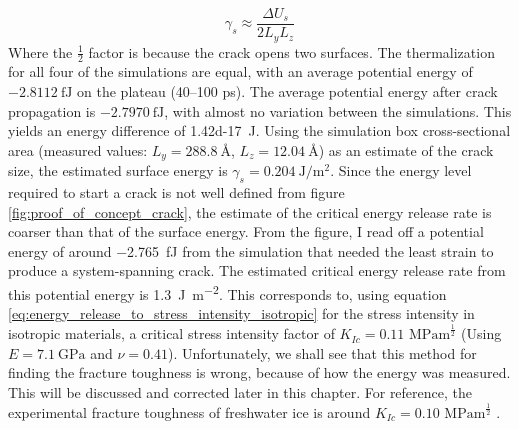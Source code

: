 \begin{equation}
	\gamma_s \approx \frac{\Delta U_s}{2 L_y L_z}
\end{equation}
%
Where the $\frac{1}{2}$ factor is because the crack opens two surfaces. The thermalization for all four of the simulations are equal, with an average potential energy of $\SI{-2.8112}{\femto\joule}$ on the plateau (40--100 \si{\pico\second}). The average potential energy after crack propagation is $\SI{-2.7970}{\femto\joule}$, with almost no variation between the simulations. This yields an energy difference of \SI{1.42d-17}{\joule}. Using the simulation box cross-sectional area (measured values: $L_y = \SI{288.8}{\angstrom}$, $L_z = \SI{12.04}{\angstrom}$) as an estimate of the crack size, the estimated surface energy is $\gamma_s = \SI{0.204}{\joule\per\meter\squared}$. Since the energy level required to start a crack is not well defined from figure \ref{fig:proof_of_concept_crack}, the estimate of the critical energy release rate is coarser than that of the surface energy. From the figure, I read off a potential energy of around \SI{-2.765}{\femto\joule} from the simulation that needed the least strain to produce a system-spanning crack. The estimated critical energy release rate from this potential energy is \SI{1.3}{\joule\per\meter\squared}. This corresponds to, using equation \ref{eq:energy_release_to_stress_intensity_isotropic} for the stress intensity in isotropic materials, a critical stress intensity factor of $K_{Ic} = 0.11 \text{ MPam}^{\frac{1}{2}}$ (Using $E=\SI{7.1}{\giga\pascal}$ and $\nu = 0.41$). Unfortunately, we shall see that this method for finding the fracture toughness is wrong, because of how the energy was measured. This will be discussed and corrected later in this chapter. For reference, the experimental fracture toughness of freshwater ice is around $K_{Ic} = 0.10 \text{ MPam}^{\frac{1}{2}}$ \cite{benham1996mechanics}. 

